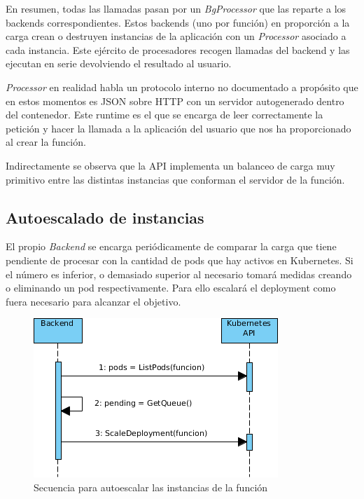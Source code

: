 En resumen, todas las llamadas pasan por un \emph{BgProcessor} que las reparte a los backends correspondientes. Estos backends (uno por función) en proporción a la carga crean o destruyen instancias de la aplicación con un \emph{Processor} asociado a cada instancia. Este ejército de procesadores recogen llamadas del backend y las ejecutan en serie devolviendo el resultado al usuario.

\emph{Processor} en realidad habla un protocolo interno no documentado a propósito que en estos momentos es JSON sobre HTTP con un servidor autogenerado dentro del contenedor. Este runtime es el que se encarga de leer correctamente la petición y hacer la llamada a la aplicación del usuario que nos ha proporcionado al crear la función.

Indirectamente se observa que la API implementa un balanceo de carga muy primitivo entre las distintas instancias que conforman el servidor de la función.

\subsection{Autoescalado de instancias}

El propio \emph{Backend} se encarga periódicamente de comparar la carga que tiene pendiente de procesar con la cantidad de pods que hay activos en Kubernetes. Si el número es inferior, o demasiado superior al necesario tomará medidas creando o eliminando un pod respectivamente. Para ello escalará el deployment como fuera necesario para alcanzar el objetivo.

\begin{figure}[H]
    \centering
    \includegraphics[width=\textwidth]{../images/secuencia/autoescalado.png}
    \caption{Secuencia para autoescalar las instancias de la función}
\end{figure}